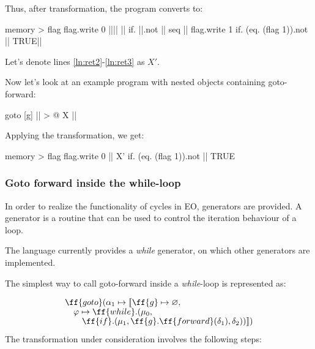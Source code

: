 \documentclass[sigplan,review,11pt,nonacm,natbib=false]{acmart}
\newcommand\br{\\[-4pt]}
\begin{document}
Thus, after transformation, the program converts to:
\begin{ffcode}
memory > flag
flag.write 0
|||$\label{ln:ret2}$|
  ||
  if.
    ||.not
    ||
    seq
      ||
      flag.write 1
  if.
    (eq. (flag 1)).not
    ||
    TRUE|$\label{ln:ret3}$|
\end{ffcode}

Let's denote lines \ref{ln:ret2}-\ref{ln:ret3} as $X'$.

Now let's look at an example program with nested objects containing goto-forward:

\begin{ffcode}
goto
  [g]
    || > @
      X
      ||
\end{ffcode}

Applying the transformation, we get:
\begin{ffcode}
memory > flag
flag.write 0
||
  X'
  if.
    (eq. (flag 1)).not
    ||
    TRUE
\end{ffcode}


\subsubsection{Goto forward inside the while-loop}
In order to realize the functionality of cycles in EO, generators are provided. A generator is a routine that can be used to control the iteration behaviour of a loop.

The language currently provides a \emph{while} generator, on which other generators are implemented.

The simplest way to call goto-forward inside a \emph{while}-loop is represented as:

\begin{equation}
\begin{split}
& \ff{goto} ( \alpha_1 \mapsto \llbracket \ff{g} \mapsto \varnothing, \br
& \quad \varphi \mapsto \ff{while}.(\mu_0, \br
& \quad \quad \ff{if}.(\mu_1, \ff{g}.\ff{forward}(\delta_1), \delta_2) ) \rrbracket) \br
\end{split}
\end{equation}

The transformation under consideration involves the following steps:

\end{document}
